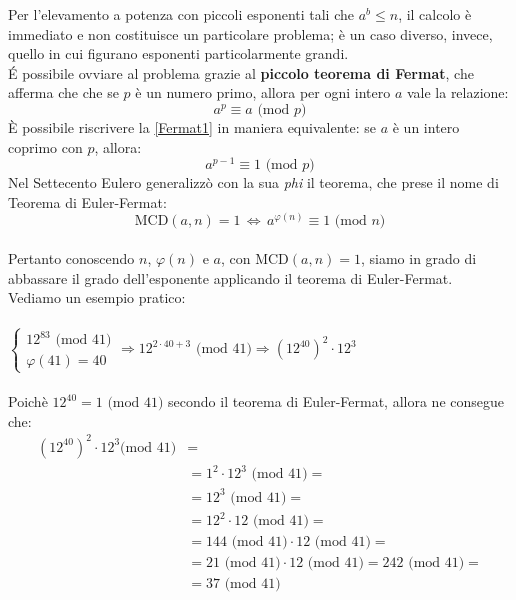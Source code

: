 \documentclass[a4paper,12pt]{article}
\begin{document}
Per l'elevamento a potenza con piccoli esponenti tali che $a^b \leq n$, il calcolo è immediato e non costituisce un particolare problema; è un caso diverso, invece, quello in cui figurano esponenti particolarmente grandi.\\
\'E possibile ovviare al problema grazie al \textbf{piccolo teorema di Fermat}, che afferma che che se $p$ è un numero primo, allora per ogni intero $a$ vale la relazione:
\begin{equation}\label{Fermat1}
    a^p \equiv a \text{ (mod $p$)}
\end{equation}
È possibile riscrivere la \eqref{Fermat1} in maniera equivalente: se $a$ è un intero coprimo con $p$, allora:
\begin{equation}\label{Fermat2}
    a^{p-1} \equiv 1 \text{ (mod $p$)}
\end{equation}
Nel Settecento Eulero generalizzò con la sua \emph{phi} il teorema, che prese il nome di Teorema di Euler-Fermat:
\begin{equation}\label{EulerFermat}
    \text{MCD$(a,n)=1$} \, \Longleftrightarrow \, a^{\varphi(n)} \equiv 1 \text{ (mod $n$)}
\end{equation}\\
Pertanto conoscendo $n$, $\varphi(n)$ e $a$, con MCD$(a,n)=1$, siamo in grado di abbassare il grado dell'esponente applicando il teorema di Euler-Fermat.\\
Vediamo un esempio pratico:\\\\
$\left \{ \begin{array}{lr}
12^{83} \text{ (mod $41$)}\\
\varphi(41)=40
\end{array}
\right. \Longrightarrow 12^{2 \cdot 40 + 3} \text{ (mod $41$)} \Longrightarrow \left(12^{40}\right)^2\cdot 12^3$ \\\\
Poichè $12^{40} = 1 \text{ (mod $41$)}$ secondo il teorema di Euler-Fermat, allora ne consegue che:
\begin{equation}
\begin{split}
\left(12^{40}\right)^2\cdot 12^3 \text{(mod $41$)} & =\\
& = 1^2 \cdot 12^3 \text{ (mod $41$)} =\\
& = 12^3 \text{ (mod $41$)} =\\
& = 12^2 \cdot 12 \text{ (mod $41$)} =\\
& = 144 \text{ (mod $41$)} \cdot 12 \text{ (mod $41$)} =\\
& = 21 \text{ (mod $41$)} \cdot 12 \text{ (mod $41$)} = 242 \text{ (mod $41$)} =\\
& = 37 \text{ (mod $41$)}
\end{split}
\end{equation}\\
\end{document}
